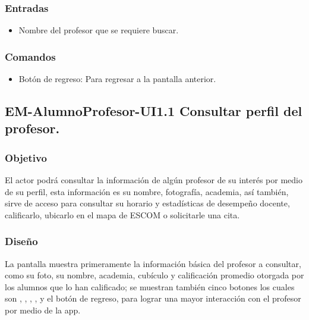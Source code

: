 \subsubsection{Entradas}
	\noindent
	\begin{itemize}
		\item Nombre del profesor que se requiere buscar.  
	\end{itemize}

\subsubsection{Comandos}
	\noindent
 	\begin{itemize}
		\item Botón de regreso: Para regresar a la pantalla anterior. 
	\end{itemize}



\pagebreak
\subsection{EM-AlumnoProfesor-UI1.1 Consultar perfil del profesor.}

\subsubsection{Objetivo}
	\noindent
	El actor podrá consultar la información de algún profesor de su interés por medio de su perfil, esta información es su nombre, fotografía, academia, así también, sirve de acceso para consultar su horario y estadísticas de desempeño docente, calificarlo, ubicarlo en el mapa de ESCOM o solicitarle una cita. 


\subsubsection{Diseño}
	\noindent
	La pantalla muestra primeramente la información básica del profesor a consultar, como su foto, su nombre, academia, cubículo y calificación promedio otorgada por los alumnos que lo han calificado; se muestran también cinco botones los cuales son , , , ,  y el botón de regreso, para lograr una mayor interacción con el profesor por medio de la app.

\pagebreak
{}

